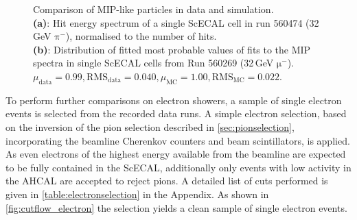 \documentclass[twoside,a4paper,12pt]{article}
\newcommand\piminus{\(\mathrm{\pi^-}\)}
\newcommand\muminus{\(\mathrm{\mu^-}\)}
\begin{document}
\begin{figure}[htbp]
	\hfill
	
	\caption[]{Comparison of MIP-like particles in data and simulation. \\\textbf{(a)}: Hit energy spectrum of a single ScECAL cell in run 560474 (32\,GeV \piminus), normalised to the number of hits. \\\textbf{(b)}: Distribution of fitted most probable values of fits to the MIP spectra in single ScECAL cells from Run 560269 (32\,GeV \muminus). \\$\mu_\text{data}=0.99, \text{RMS}_\text{data}=0.040, \mu_\text{MC}=1.00, \text{RMS}_\text{MC}=0.022$.}
	\label{fig:MIP}
\end{figure}

To perform further comparisons on electron showers, a sample of single electron events is selected from the recorded data runs. A simple electron selection, based on the inversion of the pion selection described in \autoref{sec:pionselection}, incorporating the beamline Cherenkov counters and beam scintillators, is applied. As even electrons of the highest energy available from the beamline are expected to be fully contained in the ScECAL, additionally only events with low activity in the AHCAL are accepted to reject pions. A detailed list of cuts performed is given in \autoref{table:electronselection} in the Appendix. As shown in \autoref{fig:cutflow_electron} the selection yields a clean sample of single electron events. 
\end{document}
